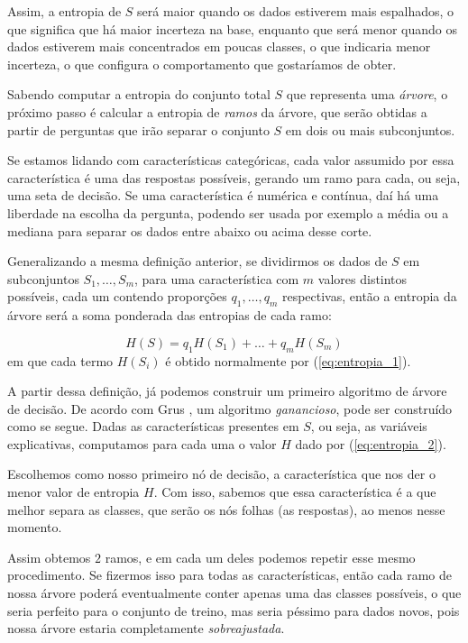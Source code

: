 Assim, a entropia de $S$ será maior quando os dados estiverem mais espalhados, o que significa que há maior incerteza na base, enquanto que será menor quando os dados estiverem mais concentrados em poucas classes, o que indicaria menor incerteza, o que configura o comportamento que gostaríamos de obter.

Sabendo computar a entropia do conjunto total $S$ que representa uma \emph{árvore}, o próximo passo é calcular a entropia de \emph{ramos} da árvore, que serão obtidas a partir de perguntas que irão separar o conjunto $S$ em dois ou mais subconjuntos.

Se estamos lidando com características categóricas, cada valor assumido por essa característica é uma das respostas possíveis, gerando um ramo para cada, ou seja, uma seta de decisão. Se uma característica é numérica e contínua, daí há uma liberdade na escolha da pergunta, podendo ser usada por exemplo a média ou a mediana para separar os dados entre abaixo ou acima desse corte.

Generalizando a mesma definição anterior, se dividirmos os dados de $S$ em subconjuntos $S_1, \ldots, S_m$, para uma característica com $m$ valores distintos possíveis, cada um contendo proporções $q_1, \ldots, q_m$ respectivas, então a entropia da árvore será a soma ponderada das entropias de cada ramo:

\begin{equation}\label{eq:entropia_2}
H(S) = q_1 H(S_1) + \ldots + q_m H(S_m)
\end{equation}
em que cada termo $H(S_i)$ é obtido normalmente por (\ref{eq:entropia_1}).

A partir dessa definição, já podemos construir um primeiro algoritmo de árvore de decisão. De acordo com Grus \citep{data}, um algoritmo \emph{ganancioso}, pode ser construído como se segue. Dadas as características presentes em $S$, ou seja, as variáveis explicativas, computamos para cada uma o valor $H$ dado por (\ref{eq:entropia_2}).

Escolhemos como nosso primeiro nó de decisão, a característica que nos der o menor valor de entropia $H$. Com isso, sabemos que essa característica é a que melhor separa as classes, que serão os nós folhas (as respostas), ao menos nesse momento.

Assim obtemos $2$ ramos, e em cada um deles podemos repetir esse mesmo procedimento. Se fizermos isso para todas as características, então cada ramo de nossa árvore poderá eventualmente conter apenas uma das classes possíveis, o que seria perfeito para o conjunto de treino, mas seria péssimo para dados novos, pois nossa árvore estaria completamente \emph{sobreajustada}.


